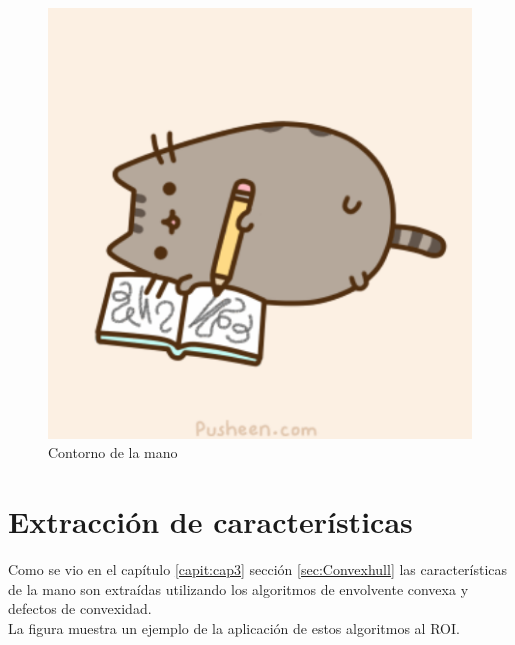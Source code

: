 \begin{figure}[!h]
\begin{center}
\includegraphics[scale=.5]{./Figures/pusheen.png}
\end{center}
\caption{Contorno de la mano}
\label{fig:ImageHandContour}
\end{figure}
  


\section{Extracción de características}\label{sec:ExtraccionCaracteristicasSystem}

Como se vio en el capítulo \ref{capit:cap3} sección \ref{sec:Convexhull} las características de la mano son extraídas utilizando los algoritmos de envolvente convexa y  defectos de convexidad.\\
La figura muestra un ejemplo de la aplicación de estos algoritmos al ROI.  

